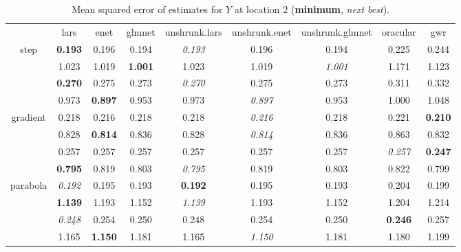 \documentclass[authoryear, review, 11pt]{elsarticle}
\begin{document}
\begin{table}[ht]
\begin{center}
\begin{tabular}{ccccccccc}
  & lars & enet & glmnet & unshrunk.lars & unshrunk.enet & unshrunk.glmnet & oracular & gwr \\ 
  \cline{2-9}
  \multirow{4}{*}{step} & \textbf{0.193} & 0.196 & 0.194 & \emph{0.193} & 0.196 & 0.194 & 0.225 & 0.244 \\ 
  & 1.023 & 1.019 & \textbf{1.001} & 1.023 & 1.019 & \emph{1.001} & 1.171 & 1.123 \\ 
  & \textbf{0.270} & 0.275 & 0.273 & \emph{0.270} & 0.275 & 0.273 & 0.311 & 0.332 \\ 
  & 0.973 & \textbf{0.897} & 0.953 & 0.973 & \emph{0.897} & 0.953 & 1.000 & 1.048 \\ 
  \cline{2-9}
  \multirow{4}{*}{gradient} & 0.218 & 0.216 & 0.218 & 0.218 & \emph{0.216} & 0.218 & 0.221 & \textbf{0.210} \\ 
  & 0.828 & \textbf{0.814} & 0.836 & 0.828 & \emph{0.814} & 0.836 & 0.863 & 0.832 \\ 
  & 0.257 & 0.257 & 0.257 & 0.257 & 0.257 & 0.257 & \emph{0.257} & \textbf{0.247} \\ 
  & \textbf{0.795} & 0.819 & 0.803 & \emph{0.795} & 0.819 & 0.803 & 0.822 & 0.799 \\ 
  \cline{2-9}
  \multirow{4}{*}{parabola} & \emph{0.192} & 0.195 & 0.193 & \textbf{0.192} & 0.195 & 0.193 & 0.204 & 0.199 \\ 
  & \textbf{1.139} & 1.193 & 1.152 & \emph{1.139} & 1.193 & 1.152 & 1.204 & 1.214 \\ 
  & \emph{0.248} & 0.254 & 0.250 & 0.248 & 0.254 & 0.250 & \textbf{0.246} & 0.257 \\ 
  & 1.165 & \textbf{1.150} & 1.181 & 1.165 & \emph{1.150} & 1.181 & 1.180 & 1.199 \\ 
  \end{tabular}
\caption{Mean squared error of estimates for $Y$ at location 2 (\textbf{minimum}, \emph{next best}).\label{table:loc2-MSEY}}
\end{center}
\end{table}
\end{document}
